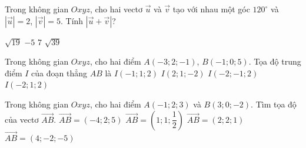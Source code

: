 \begin{ex}%
	Trong không gian $Oxyz$, cho hai vectơ $\overrightarrow{u}$ và $\overrightarrow{v}$ tạo với nhau một góc $120^{\circ}$ và $\left|{\overrightarrow{u}}\right|=2$, $\left|{\overrightarrow{v}}\right|=5$. Tính $\left|{\overrightarrow{u} + \overrightarrow{v}}\right|$?

	\choice
	{\True $\sqrt{19}$}
	{$-5$}
	{$7$}
	{$\sqrt{39}$}


\end{ex}

\begin{ex}%
	Trong không gian $Oxyz$, cho hai điểm $A(-3;2;-1)$, $B(-1;0;5)$. Tọa độ trung điểm $I$ của đoạn thẳng $AB$ là
	\choice
	{$I(-1;1;2)$}
	{$I(2;1;-2)$}
	{$I(-2;-1;2)$}
	{\True $I(-2;1;2)$}
	\end{ex}

\begin{ex}%
	Trong không gian $Oxyz$, cho hai điểm $A(-1;2;3)$ và $B(3;0;-2)$. Tìm tọa độ của vectơ $\overrightarrow{AB}$.
	\choice
	{$\overrightarrow{AB}=\left(-4;2;5\right)$}
	{$\overrightarrow{AB}=\left(1;1;\dfrac{1}{2}\right)$}
	{$\overrightarrow{AB}=\left(2;2;1\right)$}
	{\True $\overrightarrow{AB}=\left(4;-2;-5\right)$}
\end{ex}

